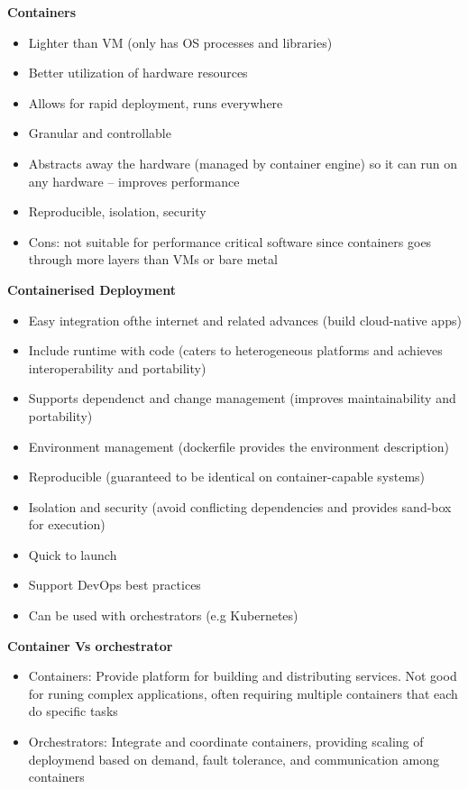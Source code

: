 \documentclass[10pt, landscape]{article}
\begin{document}
\begin{multicols}{4}
\textbf{Containers}
\begin{itemize}
    \item Lighter than VM (only has OS processes and libraries)
    \item Better utilization of hardware resources
    \item Allows for rapid deployment, runs everywhere 
    \item Granular and controllable 
    \item Abstracts away the hardware (managed by container engine) so it can run on any hardware -- improves performance
    \item Reproducible, isolation, security
    \item Cons: not suitable for performance critical software since containers goes through more layers than VMs or bare metal
\end{itemize}

\textbf{Containerised Deployment} 
\begin{itemize}
  \item Easy integration ofthe internet and related advances (build cloud-native apps)
  \item Include runtime with code (caters to heterogeneous platforms and achieves interoperability and portability)
  \item Supports dependenct and change management (improves maintainability and portability)
  \item Environment management (dockerfile provides the environment description)
  \item Reproducible (guaranteed to be identical on container-capable systems)
  \item Isolation and security (avoid conflicting dependencies and provides sand-box for execution) 
  \item Quick to launch 
  \item Support DevOps best practices 
  \item Can be used with orchestrators (e.g Kubernetes)
\end{itemize}

\textbf{Container Vs orchestrator}
\begin{itemize}
  \item Containers: Provide platform for building and distributing services. Not good for runing complex applications, often requiring multiple containers that each do specific tasks 
  \item Orchestrators: Integrate and coordinate containers, providing scaling of deploymend based on demand, fault tolerance, and communication among containers
\end{itemize}


\end{multicols}
\end{document}
